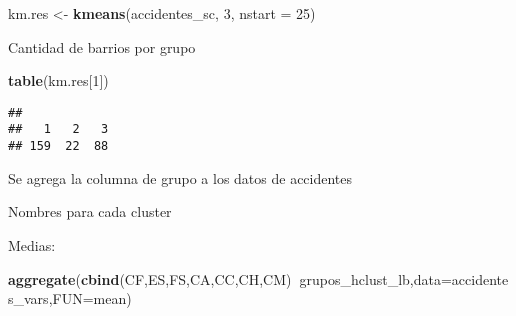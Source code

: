 \documentclass[
]{article}
\newenvironment{Shaded}{\begin{snugshade}}{\end{snugshade}}
\newcommand{\DataTypeTok}[1]{\textcolor[rgb]{0.13,0.29,0.53}{#1}}
\newcommand{\DecValTok}[1]{\textcolor[rgb]{0.00,0.00,0.81}{#1}}
\newcommand{\KeywordTok}[1]{\textcolor[rgb]{0.13,0.29,0.53}{\textbf{#1}}}
\newcommand{\NormalTok}[1]{#1}
\newcommand{\OperatorTok}[1]{\textcolor[rgb]{0.81,0.36,0.00}{\textbf{#1}}}
\newcommand{\StringTok}[1]{\textcolor[rgb]{0.31,0.60,0.02}{#1}}
\begin{document}
\begin{Shaded}
\begin{Highlighting}[]
\NormalTok{km.res <-}\StringTok{ }\KeywordTok{kmeans}\NormalTok{(accidentes_sc, }\DecValTok{3}\NormalTok{, }\DataTypeTok{nstart =} \DecValTok{25}\NormalTok{)}
\end{Highlighting}
\end{Shaded}

Cantidad de barrios por grupo

\begin{Shaded}
\begin{Highlighting}[]
\KeywordTok{table}\NormalTok{(km.res[}\DecValTok{1}\NormalTok{])}
\end{Highlighting}
\end{Shaded}

\begin{verbatim}
## 
##   1   2   3 
## 159  22  88
\end{verbatim}

Se agrega la columna de grupo a los datos de accidentes

\begin{Shaded}
\end{Shaded}

Nombres para cada cluster

\begin{Shaded}
\end{Shaded}

Medias:

\begin{Shaded}
\begin{Highlighting}[]
\KeywordTok{aggregate}\NormalTok{(}\KeywordTok{cbind}\NormalTok{(CF,ES,FS,CA,CC,CH,CM)}\OperatorTok{~}\NormalTok{grupos_hclust_lb,}\DataTypeTok{data=}\NormalTok{accidentes_vars,}\DataTypeTok{FUN=}\NormalTok{mean)}
\end{Highlighting}
\end{Shaded}
\end{document}

